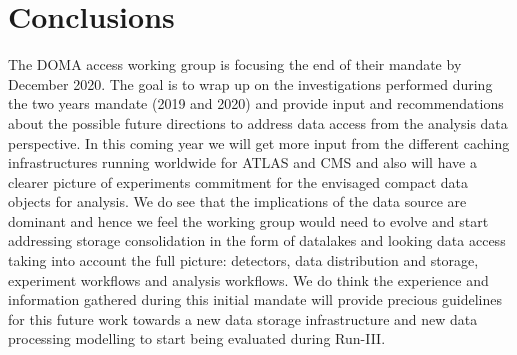 \section{Conclusions}
The DOMA access working group is focusing the end of their mandate by December 2020. The goal is to wrap up on the investigations performed during the two years mandate (2019 and 2020) and provide input and recommendations about the possible future directions to address data access from the analysis data perspective. In this coming year we will get more input from the different caching infrastructures running worldwide for ATLAS and CMS and also will have a clearer picture of experiments commitment for the envisaged compact data objects for analysis. We do see that the implications of the data source are dominant and hence we feel the working group would need to evolve and start addressing storage consolidation in the form of datalakes and looking data access taking into account the full picture: detectors, data distribution and storage, experiment workflows and analysis workflows. We do think the experience and information gathered during this initial mandate will provide precious guidelines for this future work towards a new data storage infrastructure and new data processing modelling to start being evaluated during Run-III.